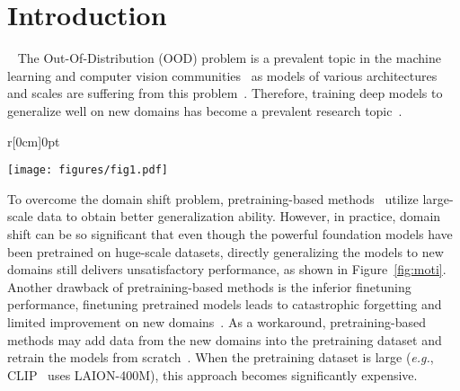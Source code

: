 \documentclass{article} \usepackage{iclr2024_conference,times}
\begin{document}
	\section{Introduction} ~\label{sec:intro}
The Out-Of-Distribution (OOD) problem is a prevalent topic in the machine learning and computer vision communities~\citep{long2015learning,saito2020universal,sun2016deep,ebrahimi2020adversarial} as models of various architectures and scales are suffering from this problem~\citep{zhou2022domain,li2022sparse,chen2022compound,peng2022semantic}. Therefore, training deep models to generalize well on new domains has become a prevalent research topic~\citep{long2015learning,li2018domain,wang2019transferable,chen2022contrastive,cha2021swad,cha2022domain}. 
\begin{wrapfigure}{r}[0cm]{0pt}
    \begin{minipage}{0.49\linewidth}
		\vspace{-1mm}
        \texttt{[image: figures/fig1.pdf]}
        \vspace{-5.5mm}
        \caption{Large-scale pretrained foundation models are still suffering from domain shifts.}
        \label{fig:moti}
        \vspace{-5mm}
    \end{minipage}
    \end{wrapfigure}
    To overcome the domain shift problem, pretraining-based methods~\citep{radford2021learning,singh2022revisiting,cha2022domain} utilize large-scale data to obtain better generalization ability. However, in practice, domain shift can be so significant that even though the powerful foundation models have been pretrained on huge-scale datasets, directly generalizing the models to new domains still delivers unsatisfactory performance, as shown in Figure~\ref{fig:moti}.
Another drawback of pretraining-based methods is the inferior finetuning performance, finetuning pretrained models leads to catastrophic forgetting and limited improvement on new domains~\citep{cha2022domain,li2022uncertainty,chen2022self}. As a workaround, pretraining-based methods may add data from the new domains into the pretraining dataset and retrain the models from scratch~\citep{shu2023clipood}. When the pretraining dataset is large (\textit{e.g.}, CLIP~\citep{radford2021learning} uses LAION-400M), this approach becomes significantly expensive.
    
\end{document}
